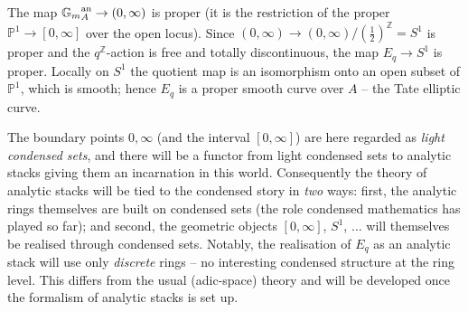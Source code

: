 \begin{proposition}
\label{prop:14:Eq-proper-smooth}
The map ${\mathbb{G}_{m}}^{\mathrm{an}}_{A}\to(0,\infty)$ is proper (it is the restriction of the
proper $\mathbb{P}^1\to[0,\infty]$ over the open locus). Since $(0,\infty)\to(0,\infty)/(\tfrac12)^{\mathbb{Z}}=S^1$ is
proper and the $q^{\mathbb{Z}}$-action is free and totally discontinuous, the map
$E_q\to S^1$ is proper. Locally on $S^1$ the quotient map is an isomorphism onto an
open subset of $\mathbb{P}^1$, which is smooth; hence $E_q$ is a proper smooth curve
over $A$ -- the Tate elliptic curve.
\end{proposition}

\begin{remark}
\label{rmk:14:two-roles}
The boundary points $0,\infty$ (and the interval $[0,\infty]$) are here regarded as
\emph{light condensed sets}, and there will be a functor from light condensed sets to
analytic stacks giving them an incarnation in this world. Consequently the theory of
analytic stacks will be tied to the condensed story in \emph{two} ways: first, the
analytic rings themselves are built on condensed sets (the role condensed mathematics
has played so far); and second, the geometric objects $[0,\infty]$, $S^1$, $\dots$
will themselves be realised through condensed sets. Notably, the realisation of $E_q$
as an analytic stack will use only \emph{discrete} rings -- no interesting condensed
structure at the ring level. This differs from the usual (adic-space) theory and will
be developed once the formalism of analytic stacks is set up.
\end{remark}

